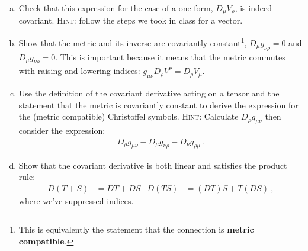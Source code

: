 \documentclass[12pt]{article}
\numberwithin{equation}{section}    %
\begin{document}
\begin{enumerate}[(a)]
	\item Check that this expression for the case of a one-form, $D_\mu V_\rho$, is indeed covariant. \textsc{Hint}: follow the steps we took in class for a vector.
	\item Show that the metric and its inverse are covariantly constant\footnote{This is equivalently the statement that the connection is \textbf{metric compatible}.}, $D_\mu g_{\nu\rho} = 0$ and $D_\mu g_{\nu\rho} = 0$. This is important because it means that the metric commutes with raising and lowering indices: $g_{\mu\nu}D_\rho V^\nu = D_\rho V_\mu$.
	\item Use the definition of the covariant derivative acting on a tensor and the statement that the metric is covariantly constant to derive the expression for the (metric compatible) Christoffel symbols. \textsc{Hint}: Calculate $D_\rho g_{\mu\nu}$ then consider the expression:
	\begin{align}
		D_\rho g_{\mu\nu} - D_\mu g_{\nu\rho} - D_\nu g_{\rho\mu} \ .
	\end{align}
%
%
	\item Show that the covariant derivative is both linear and satisfies the product rule:
	\begin{align}
		D(T+S) &= DT + DS
		&
		D(TS) &= (DT)S + T(DS) \ ,
	\end{align} 
	where we've suppressed indices. 
\end{enumerate}
\end{document}
